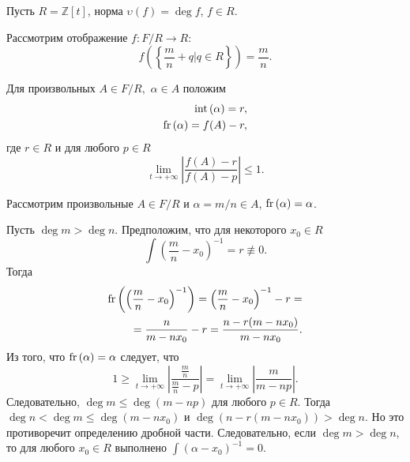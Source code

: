 \documentclass[_00_dissertation.tex]{subfiles}
\begin{document}
\begin{example}\label{example:Z[t]}
    Пусть $R = \mathbb{Z}[t]$, норма $\upsilon(f) = \deg f$, $f \in R$.

    Рассмотрим отображение $f: F/R \to R$:
    \begin{equation*}
        f\left(
            \left\{
                \frac{m}{n} + q \Big| q \in R
            \right\}
        \right) = \frac{m}{n}.
    \end{equation*}

    Для произвольных $A \in F/R,$ $\alpha \in A$ положим
    \begin{equation*}
        \begin{split}
            \textrm{int}\left(\alpha\right) = r,\\
            \textrm{fr}\left(\alpha\right) = f(A) - r,
        \end{split}
    \end{equation*}
    где $r \in R$ и для любого $p \in R$
    \begin{equation*}
        \lim_{t \to +\infty}\left|
            \frac{f(A) - r}{f(A) - p}
        \right| \le 1.
    \end{equation*}

    Рассмотрим произвольные $A \in F/R$ и $\alpha = m/n \in A$, $\textrm{fr}\left(\alpha\right) = \alpha$.

    Пусть $\deg m > \deg n$.
    Предположим, что для некоторого $x_0 \in R$
    \begin{equation*}
        \int{\left(
            \frac{m}{n} - x_0
        \right)^{-1}} = r \not\equiv 0.
    \end{equation*}
    Тогда
    \begin{equation*}
        \begin{split}
            \textrm{fr}\left(\left(
                \frac{m}{n} - x_0
            \right)^{-1}\right) = \left(
                \frac{m}{n} - x_0
            \right)^{-1} - r =\\
            = \frac{n}{m - n x_0} - r = \frac{n - r(m - n x_0)}{m - n x_0}.
        \end{split}
    \end{equation*}
    Из того, что $\textrm{fr}\left(\alpha\right) = \alpha$ следует, что
    \begin{equation*}
        1 \ge \lim_{t \to +\infty}\left|
            \frac{\frac{m}{n}}{\frac{m}{n} - p}
        \right| = \lim_{t \to +\infty}\left|
            \frac{m}{m - n p}
        \right|.
    \end{equation*}
    Следовательно, $\deg m \le \deg(m - n p)$ для любого $p \in R$.
    Тогда $\deg n < \deg m \le \deg(m - n x_0)$ и $\deg(n - r(m - n x_0)) > \deg n$.
    Но это противоречит определению дробной части.
    Следовательно, если $\deg m > \deg n$, то для любого $x_0 \in R$ выполнено $\int{(\alpha - x_{0})^{-1}} = 0$.


\end{example}
\end{document}
